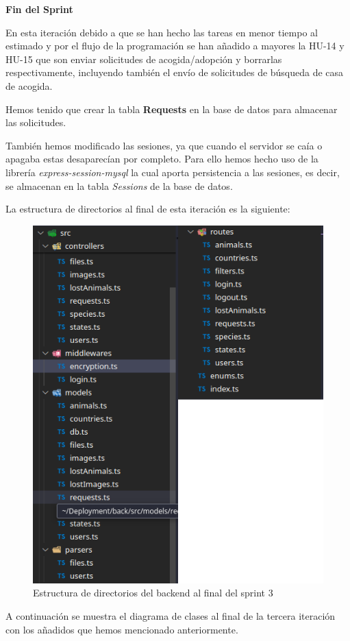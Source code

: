 \textbf{Fin del Sprint}

En esta iteración debido a que se han hecho las tareas en menor tiempo al estimado y por el flujo de la programación se han añadido a mayores la HU-14 y HU-15 que son enviar solicitudes de acogida/adopción y borrarlas respectivamente, incluyendo también el envío de solicitudes de búsqueda de casa de acogida.

Hemos tenido que crear la tabla \textbf{Requests} en la base de datos para almacenar las solicitudes.

También hemos modificado las sesiones, ya que cuando el servidor se caía o apagaba estas desaparecían por completo. Para ello hemos hecho uso de la librería \textit{express-session-mysql} la cual aporta persistencia a las sesiones, es decir, se almacenan en la tabla \textit{Sessions} de la base de datos.



La estructura de directorios al final de esta iteración es la siguiente:

\begin{figure}[H]
	\centering
	\includegraphics[width=0.7\linewidth]{"sprint 3/structuraBack"}
	\caption{Estructura de directorios del backend al final del sprint 3}
	\label{fig:structuraback}
\end{figure}

A continuación se muestra el diagrama de clases al final de la tercera iteración con los añadidos que hemos mencionado anteriormente.

